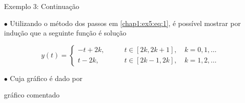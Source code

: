 \documentclass{beamer}
\theoremstyle{plain}
\theoremstyle{definition}
\begin{document}
\begin{frame}{Exemplo 3: Continuação}

     $\bullet$ Utilizando o método dos passos em \eqref{chap1:ex5:eq:1}, é possível mostrar por indução que a seguinte função é solução
     
     \[
      y(t) = 
      \begin{cases}
        -t + 2k, \qquad &t \in [2k, 2k+1], \quad k = 0, 1, \dots \\
        t - 2k, \qquad &t \in [2k - 1, 2k], \quad k = 1, 2, \dots 
      \end{cases}
     \]
     

     $\bullet$ Cuja gráfico é dado por
     
     {\color{red} \Huge gráfico comentado}

\end{frame}
\end{document}
